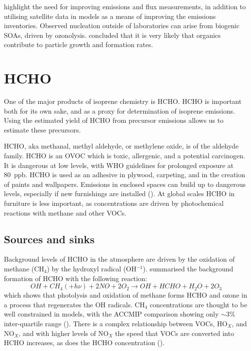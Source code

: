     \cite{Kanakidou2005} highlight the need for improving emissions and flux measurements, in addition to utilising satellite data in models as a means of improving the emissions inventories.
    Observed nucleation outside of laboratories can arise from biogenic SOAs, driven by ozonolysis.
    \cite{Kanakidou2005} concluded that it is very likely that organics contribute to particle growth and formation rates.
    
\section{HCHO}
\label{LR:HCHO}
  
  One of the major products of isoprene chemistry is HCHO.
  HCHO is important both for its own sake, and as a proxy for determination of isoprene emissions.
  Using the estimated yield of HCHO from precursor emissions allows us to estimate these precursors.
  
  HCHO, aka methanal, methyl aldehyde, or methylene oxide, is of the aldehyde family.
  HCHO is an OVOC which is toxic, allergenic, and a potential carcinogen. 
  It is dangerous at low levels, with WHO guidelines for prolonged exposure at 80~ppb.
  HCHO is used as an adhesive in plywood, carpeting, and in the creation of paints and wallpapers.
  Emissions in enclosed spaces can build up to dangerous levels, especially if new furnishings are installed (\cite{Davenport2015}).
  At global scales HCHO in furniture is less important, as concentrations are driven by photochemical reactions with methane and other VOCs.
  
  \subsection{Sources and sinks}
    \label{LR:HCHO:Sources}
     
    Background levels of HCHO in the atmosphere are driven by the oxidation of methane (CH$_4$) by the hydroxyl radical (OH$^{-1}$).
    \cite{Atkinson2000} summarised the background formation of HCHO with the following reaction:
    \begin{equation*} \label{LR:HCHO:Sources:eqn_MethaneBackground}
      OH + CH_4 (+ h\nu) + 2NO + 2O_2 \rightarrow OH + HCHO + H_2O + 2O_3
    \end{equation*}
    which shows that photolysis and oxidation of methane forms HCHO and ozone in a process that regenerates the OH radicals.
    CH$_4$ concentrations are thought to be well constrained in models, with the ACCMIP comparison showing only $\sim3$\% inter-quartile range (\cite{Young2013}).
    There is a complex relationship between VOCs, HO$_X$, and NO$_X$, and with higher levels of NO$_X$ the speed that VOCs are converted into HCHO increases, as does the HCHO concentration (\cite{Wolfe2016}).
    
